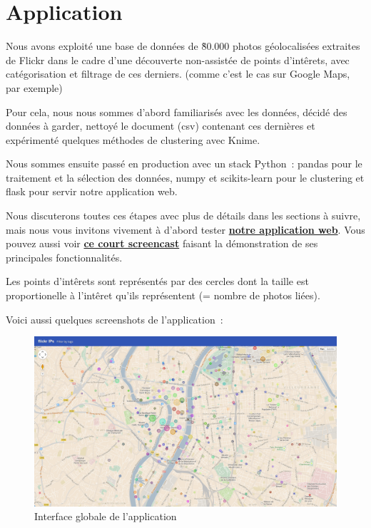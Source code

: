 \chapter{Application}

    Nous avons exploité une base de données de \~80.000 photos géolocalisées extraites de Flickr dans le cadre d'une découverte
    non-assistée de points d'intêrets, avec catégorisation et filtrage de ces derniers. (comme c'est le cas sur Google Maps, par exemple)

    Pour cela, nous nous sommes d'abord familiarisés avec les données, décidé des données à garder, nettoyé le document (csv) contenant ces dernières et expérimenté quelques méthodes de clustering avec Knime.

    Nous sommes ensuite passé en production avec un stack Python~: pandas pour le traitement et la sélection des données, numpy et scikits-learn pour le clustering et flask pour servir notre application web.

    Nous discuterons toutes ces étapes avec plus de détails dans les sections à suivre, mais nous vous invitons vivement à d'abord
    tester \href{http://188.226.171.22/}{\textbf{notre application web}}. Vous pouvez aussi voir \href{http://www.youtube.com/watch?v=SGGsvbjWYY0}{\textbf{ce court screencast}} faisant la démonstration de ses principales fonctionnalités.

    Les points d'intêrets sont représentés par des cercles dont la taille est proportionelle à l'intêret qu'ils représentent (= nombre de photos liées).

    Voici aussi quelques screenshots de l'application~:

    \begin{figure}[H]
        \centering
        \includegraphics[scale=0.25]{../screenshots/ui-global.png}
        \caption{Interface globale de l'application}
        \label{diagram:ui-global}
    \end{figure}


